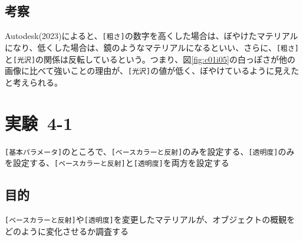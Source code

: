 \documentclass[a4j]{jarticle}
\begin{document}
\subsection{考察}
%
Autodesk(2023)によると、\verb|[粗さ]|の数字を高くした場合は、ぼやけたマテリアルになり、低くした場合は、鏡のようなマテリアルになるといい、さらに、\verb|[粗さ]|と\verb|[光沢]|の関係は反転しているという\cite{3dsmaxkoutaku}。つまり、図\ref{fig:c01i05}の白っぽさが他の画像に比べて強いことの理由が、\verb|[光沢]|の値が低く、ぼやけているように見えたと考えられる。
%

\newpage
\section{実験\ 4-1}
\verb|[基本パラメータ]|のところで、\verb|[ベースカラーと反射]|のみを設定する、\verb|[透明度]|のみを設定する、\verb|[ベースカラーと反射]|と\verb|[透明度]|を両方を設定する
\subsection{目的}
%
\verb|[ベースカラーと反射]|や\verb|[透明度]|を変更したマテリアルが、オブジェクトの概観をどのように変化させるか調査する
%
\end{document}

